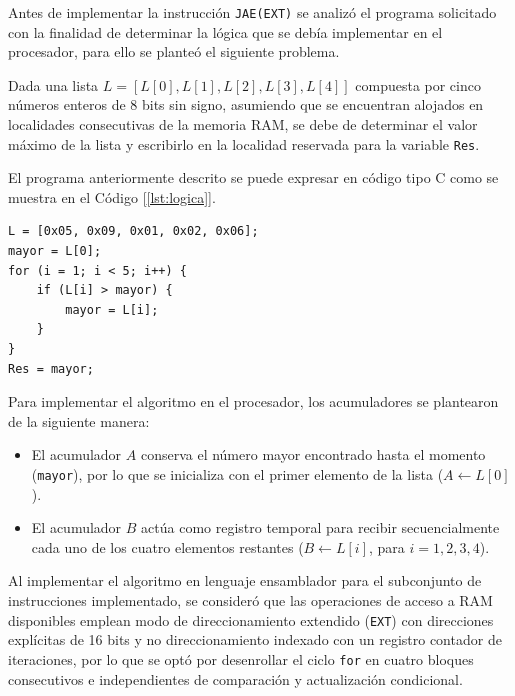 \documentclass[letterpaper,12pt]{article}
\begin{document}
Antes de implementar la instrucción \texttt{JAE(EXT)} se analizó el programa solicitado con la finalidad de determinar la lógica que se debía implementar en el procesador, para ello se planteó el siguiente problema.

Dada una lista $L = [L[0], L[1], L[2], L[3], L[4]]$ compuesta por cinco números enteros de 8 bits sin signo, asumiendo que se encuentran alojados en localidades consecutivas de la memoria RAM, se debe de determinar el valor máximo de la lista y escribirlo en la localidad reservada para la variable \texttt{Res}.

El programa anteriormente descrito se puede expresar en código tipo C como se muestra en el Código [\ref{lst:logica}].

\newpage

\begin{lstlisting}[style=pseudo,caption={Lógica del algoritmo para una lista de cinco números sin signo.},label={lst:logica}]
L = [0x05, 0x09, 0x01, 0x02, 0x06];
mayor = L[0];
for (i = 1; i < 5; i++) {
    if (L[i] > mayor) {
        mayor = L[i];
    }
}
Res = mayor;
\end{lstlisting}

Para implementar el algoritmo en el procesador, los acumuladores se plantearon de la siguiente manera:
\begin{itemize}
  \item El acumulador $A$ conserva el número mayor encontrado hasta el momento (\texttt{mayor}), por lo que se inicializa con el primer elemento de la lista ($A \leftarrow L[0]$).
  \item El acumulador $B$ actúa como registro temporal para recibir secuencialmente cada uno de los cuatro elementos restantes ($B \leftarrow L[i]$, para $i = 1, 2, 3, 4$).
\end{itemize}

Al implementar el algoritmo en lenguaje ensamblador para el subconjunto de instrucciones implementado, se consideró que las operaciones de acceso a RAM disponibles emplean modo de direccionamiento extendido (\texttt{EXT}) con direcciones explícitas de 16 bits y no direccionamiento indexado con un registro contador de iteraciones, por lo que se optó por desenrollar el ciclo \texttt{for} en cuatro bloques consecutivos e independientes de comparación y actualización condicional.
\end{document}
